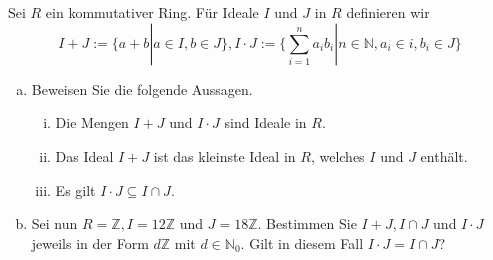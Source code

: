 \documentclass{article}
\newcommand{\N}{\mathbb{N}}
\newcommand{\Z}{\mathbb{Z}}
\begin{document}
\section{}
\subsection{}
\color{blue}
Sei $R$ ein kommutativer Ring. Für Ideale $I$ und $J$ in $R$
definieren wir
\begin{equation*}
    I+J:=\{a+b|a\in I,b\in J\},
    I\cdot J:=\{
    \sum_{i=1}^n a_ib_i|n\in\N,a_i\in i,b_i\in J\}
\end{equation*}
\color{black}
\begin{enumerate}[(a)]
    \item
        \color{blue}
        Beweisen Sie die folgende Aussagen.
        \color{black}
        \begin{enumerate}[(i)]
            \item
                \color{blue}
                Die Mengen $I+J$ und $I\cdot J$ sind Ideale in $R$.
                \color{black}
            \item
                \color{blue}
                Das Ideal $I+J$ ist das kleinste Ideal in $R$, welches $I$ und $J$ enthält.
                \color{black}
            \item
                \color{blue}
                Es gilt $I\cdot J\subseteq I\cap J$.
                \color{black}
        \end{enumerate}
    \item
        \color{blue}
        Sei nun $R=\Z, I=12\Z$ und $J=18\Z$. Bestimmen Sie $I+J,I\cap J$ und $I\cdot J$ jeweils
        in der Form $d\Z$ mit $d\in\N_0$. Gilt in diesem Fall $I\cdot J=I\cap J$?
        \color{black}
\end{enumerate}
\end{document}
